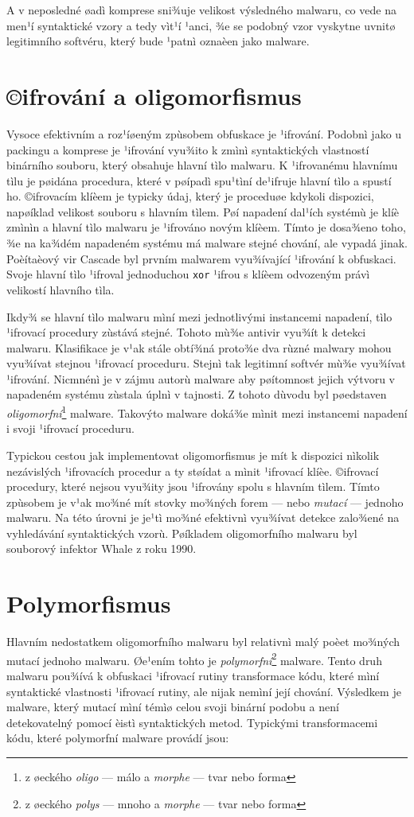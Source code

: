 A v neposledné øadì komprese sni¾uje velikost výsledného malwaru, co vede na men¹í syntaktické vzory a tedy vìt¹í ¹anci, ¾e se podobný vzor vyskytne uvnitø legitimního softvéru, který bude ¹patnì oznaèen jako malware.

\section{©ifrování a oligomorfismus}
Vysoce efektivním a roz¹íøeným zpùsobem obfuskace je ¹ifrování. Podobnì jako u packingu a komprese je ¹ifrování vyu¾ito k zmìnì syntaktických vlastností binárního souboru, který obsahuje hlavní tìlo malwaru. K ¹ifrovanému hlavnímu tìlu je pøidána procedura, které v pøípadì spu¹tìní de¹ifruje hlavní tìlo a spustí ho. ©ifrovacím klíèem je typicky údaj, který je proceduøe kdykoli dispozici, napøíklad velikost souboru s hlavním tìlem. Pøí napadení dal¹ích systémù je klíè zmìnìn a hlavní tìlo malwaru je ¹ifrováno novým klíèem. Tímto je dosa¾eno toho, ¾e na ka¾dém napadeném systému má malware stejné chování, ale vypadá jinak. Poèítaèový vir Cascade byl prvním malwarem vyu¾ívající ¹ifrování k obfuskaci. Svoje hlavní tìlo ¹ifroval jednoduchou \texttt{xor} ¹ifrou s klíèem odvozeným právì velikostí hlavního tìla. 

Ikdy¾ se hlavní tìlo malwaru mìní mezi jednotlivými instancemi napadení, tìlo ¹ifrovací procedury zùstává stejné. Tohoto mù¾e antivir vyu¾ít k detekci malwaru. Klasifikace je v¹ak stále obtí¾ná proto¾e dva rùzné malwary mohou vyu¾ívat stejnou ¹ifrovací proceduru. Stejnì tak legitimní softvér mù¾e vyu¾ívat ¹ifrování. Nicmnénì je v zájmu autorù malware aby pøítomnost jejich výtvoru v napadeném systému zùstala úplnì v tajnosti. Z tohoto dùvodu byl pøedstaven \emph{oligomorfní}\footnote{z øeckého \emph{oligo} --- málo a \emph{morphe} --- tvar nebo forma} malware. Takovýto malware doká¾e mìnit mezi instancemi napadení i svoji ¹ifrovací proceduru.

Typickou cestou jak implementovat oligomorfismus je mít k dispozici nìkolik nezávislých ¹ifrovacích procedur a ty støídat a mìnit ¹ifrovací klíèe. ©ifrovací procedury, které nejsou vyu¾ity jsou ¹ifrovány spolu s hlavním tìlem. Tímto zpùsobem je v¹ak mo¾né mít  stovky mo¾ných forem --- nebo \emph{mutací} --- jednoho malwaru. Na této úrovni je je¹tì mo¾né efektivnì vyu¾ívat detekce zalo¾ené na vyhledávání syntaktických vzorù. Pøíkladem oligomorfního malwaru byl souborový infektor Whale z roku 1990.

\section{Polymorfismus}
Hlavním nedostatkem oligomorfního malwaru byl relativnì malý poèet mo¾ných mutací jednoho malwaru. Øe¹ením tohto  je \emph{polymorfní}\footnote{z øeckého \emph{polys} --- mnoho a \emph{morphe} --- tvar nebo forma} malware. Tento druh malwaru pou¾ívá k obfuskaci ¹ifrovací rutiny transformace kódu, které mìní syntaktické vlastnosti ¹ifrovací rutiny, ale nijak nemìní její chování. Výsledkem je malware, který mutací mìní témìø celou svoji binární podobu a není detekovatelný pomocí èistì syntaktických metod. Typickými transformacemi kódu, které polymorfní malware provádí jsou:

